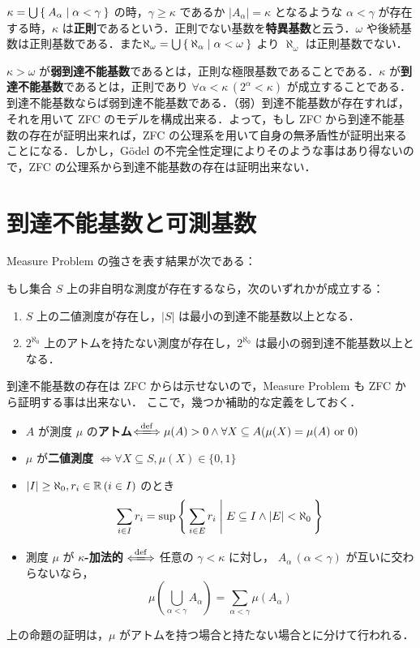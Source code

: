 \documentclass[a4j]{jsarticle}
\begin{document}
$\kappa = \bigcup \Set{ A_\alpha | \alpha < \gamma }$ の時，$\gamma \geq \kappa$ であるか $|A_\alpha| = \kappa$ となるような $\alpha < \gamma$ が存在する時，$\kappa$ は{\bfseries 正則}であるという．正則でない基数を{\bfseries 特異基数}と云う．$\omega$ や後続基数は正則基数である．また$\aleph_\omega = \bigcup \Set{ \aleph_\alpha | \alpha < \omega }$ より $\aleph_\omega$ は正則基数でない．

$\kappa > \omega$ が{\bfseries 弱到達不能基数}であるとは，正則な極限基数であることである．$\kappa$ が{\bfseries 到達不能基数}であるとは，正則であり $\forall \alpha < \kappa\, (2^\alpha < \kappa)$ が成立することである．到達不能基数ならば弱到達不能基数である．（弱）到達不能基数が存在すれば，それを用いて ZFC のモデルを構成出来る．よって，もし ZFC から到達不能基数の存在が証明出来れば，ZFC の公理系を用いて自身の無矛盾性が証明出来ることになる．しかし，G\"{o}del の不完全性定理によりそのような事はあり得ないので，ZFC の公理系から到達不能基数の存在は証明出来ない．

\section{到達不能基数と可測基数}
Measure Problem の強さを表す結果が次である：

\begin{theorem}[Ulam]\label{Thm:Ulam}
 もし集合 $S$ 上の非自明な測度が存在するなら，次のいずれかが成立する：
 \begin{enumerate}[(1)]
  \item $S$ 上の二値測度が存在し，$|S|$ は最小の到達不能基数以上となる．
	\label{cond:two-value-exists}
  \item $2^{\aleph_0}$ 上のアトムを持たない測度が存在し，$2^{\aleph_0}$ は最小の弱到達不能基数以上となる．
 \end{enumerate}
\end{theorem}

到達不能基数の存在は ZFC からは示せないので，Measure Problem も ZFC から証明する事は出来ない．
ここで，幾つか補助的な定義をしておく．

\begin{definition}
 \begin{itemize}
  \item 
  $A$ が測度 $\mu$ の{\bfseries アトム}$\defs \mu(A) > 0 \wedge \forall X \subseteq A (\mu(X) = \mu(A) \text{ or } 0)$
  \item $\mu$ が{\bfseries 二値測度} $\Leftrightarrow \forall X \subseteq S, \mu(X) \in \{0, 1\}$

  \item $|I| \geq \aleph_0, r_i \in \mathbb{R} \,(i\in I)$ のとき
	\[
	 \sum_{i \in I} r_i = \sup \Set{ \sum_{i \in E} r_i | E \subseteq I \wedge |E| < \aleph_0}
	\]
  \item 測度 $\mu$ が {\bfseries $\kappa$-加法的}
	$\defs$ 任意の $\gamma < \kappa$ に対し， $A_\alpha \, (\alpha < \gamma)$ が互いに交わらないなら，
	\[
	 \mu\left(\bigcup_{\alpha < \gamma} A_\alpha\right) = \sum_{\alpha < \gamma} \mu(A_\alpha)
	\]
 \end{itemize}
\end{definition}
上の命題の証明は，$\mu$ がアトムを持つ場合と持たない場合とに分けて行われる．
\end{document}
